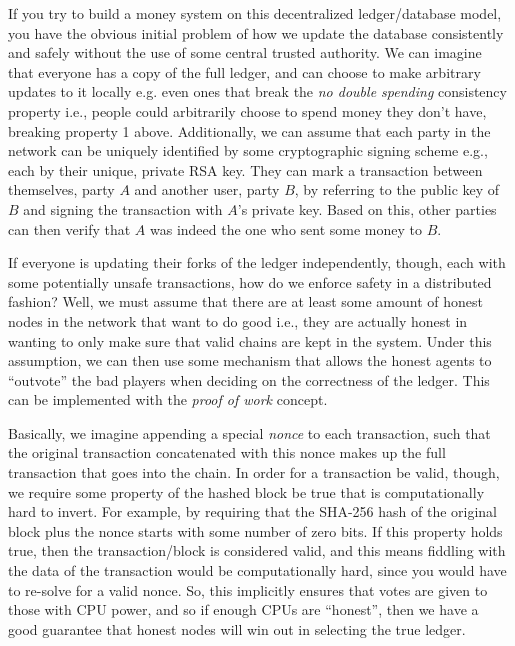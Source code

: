 \documentclass[10pt,a4paper]{article}
\begin{document}
If you try to build a money system on this decentralized ledger/database model, you have the obvious initial problem of how we update the database consistently and safely without the use of some central trusted authority. We can imagine that everyone has a copy of the full ledger, and can choose to make arbitrary updates to it locally e.g. even ones that break the \textit{no double spending} consistency property i.e., people could arbitrarily choose to spend money they don't have, breaking property 1 above. Additionally, we can assume that each party in the network can be uniquely identified by some cryptographic signing scheme e.g., each by their unique, private RSA key. They can mark a transaction between themselves, party $A$ and another user, party $B$, by referring to the public key of $B$ and signing the transaction with $A$'s private key. Based on this, other parties can then verify that $A$ was indeed the one who sent some money to $B$.

If everyone is updating their forks of the ledger independently, though, each with some potentially unsafe transactions, how do we enforce safety in a distributed fashion? Well, we must assume that there are at least some amount of honest nodes in the network that want to do good i.e., they are actually honest in wanting to only make sure that valid chains are kept in the system. Under this assumption, we can then use some mechanism that allows the honest agents to ``outvote'' the bad players when deciding on the correctness of the ledger. This can be implemented with the \textit{proof of work} concept. 

Basically, we imagine appending a special \textit{nonce} to each transaction, such that the original transaction concatenated with this nonce makes up the full transaction that goes into the chain. In order for a transaction be valid, though, we require some property of the hashed block be true that is computationally hard to invert. For example, by requiring that the SHA-256 hash of the original block plus the nonce starts with some number of zero bits. If this property holds true, then the transaction/block is considered valid, and this means fiddling with the data of the transaction would be computationally hard, since you would have to re-solve for a valid nonce. So, this implicitly ensures that votes are given to those with CPU power, and so if enough CPUs are ``honest'', then we have a good guarantee that honest nodes will win out in selecting the true ledger. 
\end{document}
